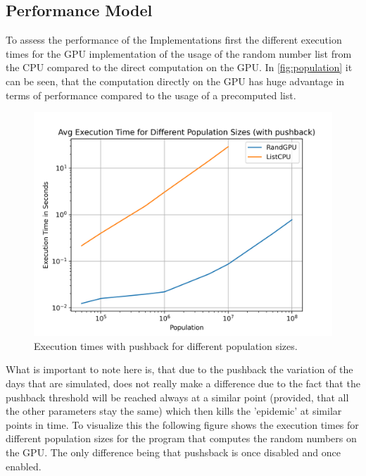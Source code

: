 \documentclass[12pt,a4paper]{article}
\begin{document}
\subsection*{Performance Model}
To assess the performance of the Implementations first the different execution times for the GPU implementation of the usage of the random number list from the CPU compared to the direct computation on the GPU. In \autoref*{fig:population} it can be seen, that the computation directly on the GPU has huge advantage in terms of performance compared to the usage of a precomputed list.
\begin{figure}[H]
    \centering
    \includegraphics[width=12cm]{../Population.png}
    \caption{Execution times with pushback for different population sizes.}
    \label{fig:population}
\end{figure}
What is important to note here is, that due to the pushback the variation of the days that are simulated, does not really make a difference due to the fact that the pushback threshold will be reached always at a similar point (provided, that all the other parameters stay the same) which then kills the 'epidemic' at similar points in time. To visualize this the following figure shows the execution times for different population sizes for the program that computes the random numbers on the GPU. The only difference being that pushsback is once disabled and once enabled.
\end{document}
